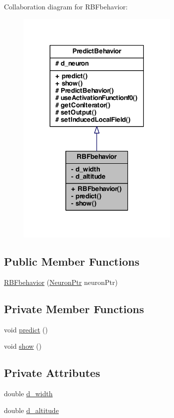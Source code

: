 Collaboration diagram for RBFbehavior:\nopagebreak
\begin{figure}[H]
\begin{center}
\leavevmode
\includegraphics[width=222pt]{class_r_b_fbehavior__coll__graph}
\end{center}
\end{figure}
\subsection*{Public Member Functions}
\begin{DoxyCompactItemize}
\item 
\hyperlink{class_r_b_fbehavior_a5122dd22cb9a6be24175afc410a82f35}{RBFbehavior} (\hyperlink{_a_m_o_r_e_8h_ac1ea936c2c7728eb382278131652fef4}{NeuronPtr} neuronPtr)
\end{DoxyCompactItemize}
\subsection*{Private Member Functions}
\begin{DoxyCompactItemize}
\item 
void \hyperlink{class_r_b_fbehavior_ac14521848163e04810a6d038aef81896}{predict} ()
\item 
void \hyperlink{class_r_b_fbehavior_a96b123a5b657e46946c3ff98ea78f5de}{show} ()
\end{DoxyCompactItemize}
\subsection*{Private Attributes}
\begin{DoxyCompactItemize}
\item 
double \hyperlink{class_r_b_fbehavior_a6b37a2973f5e8390e37333e81de26077}{d\_\-width}
\item 
double \hyperlink{class_r_b_fbehavior_a831ab08f316756149ff37a92098f7033}{d\_\-altitude}
\end{DoxyCompactItemize}


